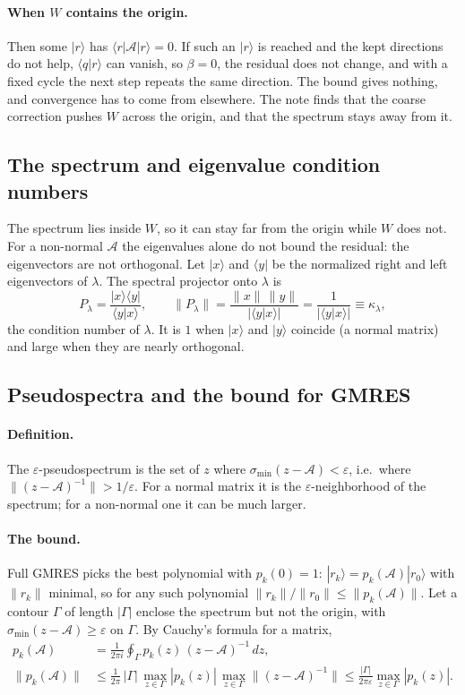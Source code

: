 \documentclass[11pt,a4paper]{article}
\numberwithin{equation}{section}
\begin{document}
\paragraph{When $W$ contains the origin.} Then some $|r\rangle$ has $\langle r|\mathcal A|r\rangle=0$.
If such an $|r\rangle$ is reached and the kept directions do not help, $\langle q|r\rangle$ can vanish,
so $\beta=0$, the residual does not change, and with a fixed cycle the next step repeats the same
direction. The bound gives nothing, and convergence has to come from elsewhere. The note finds
that the coarse correction pushes $W$ across the origin, and that the spectrum stays away from it.

\subsection{The spectrum and eigenvalue condition numbers}
The spectrum lies inside $W$, so it can stay far from the origin while $W$ does not. For a
non-normal $\mathcal A$ the eigenvalues alone do not bound the residual: the eigenvectors are not
orthogonal. Let $|x\rangle$ and $\langle y|$ be the normalized right and left eigenvectors of
$\lambda$. The spectral projector onto $\lambda$ is
\begin{equation}
P_\lambda=\frac{|x\rangle\langle y|}{\langle y|x\rangle},\qquad
\|P_\lambda\|=\frac{\|x\|\,\|y\|}{|\langle y|x\rangle|}=\frac1{|\langle y|x\rangle|}\equiv\kappa_\lambda ,
\end{equation}
the condition number of $\lambda$. It is $1$ when $|x\rangle$ and $|y\rangle$ coincide (a normal matrix)
and large when they are nearly orthogonal.

\subsection{Pseudospectra and the bound for GMRES}
\paragraph{Definition.} The $\varepsilon$-pseudospectrum is the set of $z$ where
$\sigma_{\min}(z-\mathcal A)<\varepsilon$, i.e.\ where $\|(z-\mathcal A)^{-1}\|>1/\varepsilon$. For a
normal matrix it is the $\varepsilon$-neighborhood of the spectrum; for a non-normal one it can be
much larger.

\paragraph{The bound.} Full GMRES picks the best polynomial with $p_k(0)=1$:
$|r_k\rangle=p_k(\mathcal A)|r_0\rangle$ with $\|r_k\|$ minimal, so for any such polynomial
$\|r_k\|/\|r_0\|\le\|p_k(\mathcal A)\|$. Let a contour $\Gamma$ of length $|\Gamma|$ enclose the spectrum
but not the origin, with $\sigma_{\min}(z-\mathcal A)\ge\varepsilon$ on $\Gamma$. By Cauchy's formula
for a matrix,
\begin{align}
p_k(\mathcal A)&=\frac1{2\pi i}\oint_\Gamma p_k(z)\,(z-\mathcal A)^{-1}\,dz,\nonumber\\
\|p_k(\mathcal A)\|&\le\frac1{2\pi}\,|\Gamma|\,\max_{z\in\Gamma}|p_k(z)|\,\max_{z\in\Gamma}\|(z-\mathcal A)^{-1}\|
\le\frac{|\Gamma|}{2\pi\varepsilon}\max_{z\in\Gamma}|p_k(z)| .
\end{align}
\end{document}
